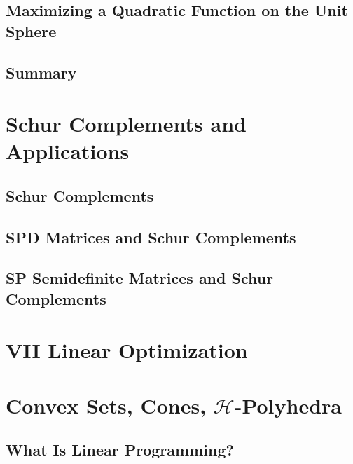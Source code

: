 \documentclass[a4paper]{article}
\begin{document}
\subsection{ Maximizing a Quadratic Function on the Unit Sphere} %

\subsection{ Summary} %


\newpage
\section{Schur Complements and Applications}
\subsection{ Schur Complements} %

\subsection{ SPD Matrices and Schur Complements} %

\subsection{ SP Semidefinite Matrices and Schur Complements} %


\newpage
\section*{VII Linear Optimization}
\section{Convex Sets, Cones, $\mathcal{H}$-Polyhedra}
\subsection{ What Is Linear Programming?} %
\end{document}
